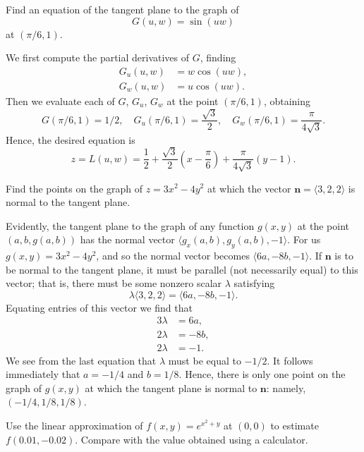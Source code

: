 \documentclass[12pt]{exam}
\renewcommand{\vec}[1]{\mathbf{#1}}
\begin{document}
\printanswers
\begin{questions}

\question Find an equation of the tangent plane to the graph of 
\[
G(u,w) = \sin (uw)
\]
at $(\pi/6, 1)$.

\begin{solution}
    We first compute the partial derivatives of $G$, finding
    \begin{align*}
        G_u(u,w) &= w \cos (uw), \\
        G_w(u,w) &= u \cos (uw).
    \end{align*}
    Then we evaluate each of $G$, $G_u$, $G_w$ at the point $(\pi/6,1)$, obtaining
    \[
        G(\pi/6, 1) = 1/2, \quad G_u(\pi/6,1) = \frac{\sqrt{3}}{2}, \quad G_w(\pi/6, 1) = \frac{\pi}{4 \sqrt{3}}.
    \]
    Hence, the desired equation is
    \[
        z = L(u,w) = \frac{1}{2} + \frac{\sqrt{3}}{2} \left(x - \frac{\pi}{6}\right) + \frac{\pi}{4 \sqrt{3}} \left(y-1\right).
    \]
\end{solution}

\question Find the points on the graph of $z = 3x^2 - 4y^2$ at which the vector $\vec{n} = \langle 3, 2, 2 \rangle$ is normal to the tangent plane.

\begin{solution}
    Evidently, the tangent plane to the graph of any function $g(x,y)$ at the point $(a,b,g(a,b))$ has the normal vector $\langle g_x(a,b), g_y(a,b), -1 \rangle$. For us $g(x,y) = 3x^2 - 4y^2$, and so the normal vector becomes $\langle 6a, -8b, -1 \rangle$. If $\vec{n}$ is to be normal to the tangent plane, it must be parallel (not necessarily equal) to this vector; that is, there must be some nonzero scalar $\lambda$ satisfying
    \[
        \lambda \langle 3, 2, 2 \rangle = \langle 6a, -8b, -1 \rangle.
    \]
    Equating entries of this vector we find that 
    \begin{align*}
        3 \lambda &= 6a, \\
        2 \lambda &= -8b, \\
        2 \lambda &= -1.
    \end{align*}
    We see from the last equation that $\lambda$ must be equal to $-1/2$. It follows immediately that $a = -1/4$ and $b = 1/8$. Hence, there is only one point on the graph of $g(x,y)$ at which the tangent plane is normal to $\vec{n}$: namely, $(-1/4, 1/8, 1/8)$.
\end{solution}

\question Use the linear approximation of $f(x,y) = e^{x^2+y}$ at $(0,0)$ to estimate $f(0.01,-0.02)$. Compare with the value obtained using a calculator.


\end{questions}
\end{document}
